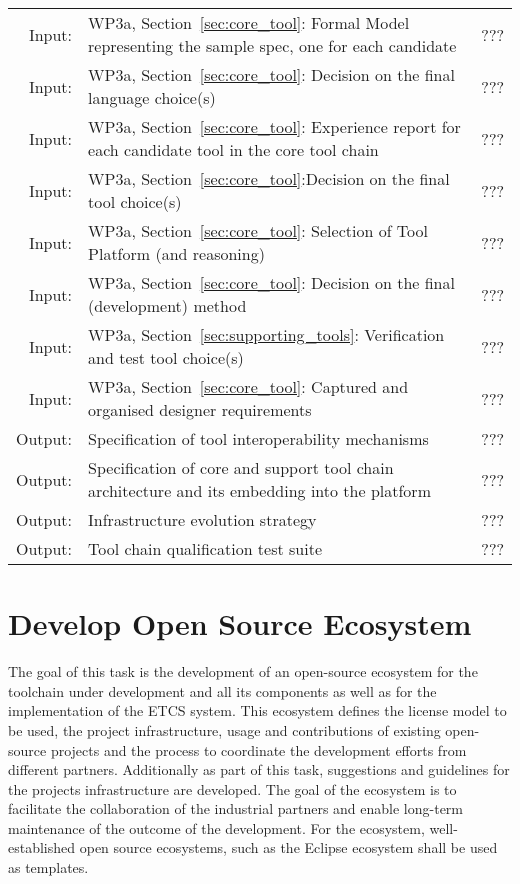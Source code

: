 \documentclass[11pt, a4paper]{article}
\newenvironment{inoutput}
{\vspace{2mm}
\noindent
\begin{tabular}{|r|p{.68\linewidth}|l|}
\hline}
{
\hline
\end{tabular}}
\begin{document}
\begin{inoutput}
Input: & WP3a, Section~\ref{sec:core_tool}: Formal Model representing the sample spec, one for each candidate  & ??? \\
Input: & WP3a, Section~\ref{sec:core_tool}: Decision on the final language choice(s) & ??? \\
Input: & WP3a, Section~\ref{sec:core_tool}: Experience report for each candidate tool in the core tool chain& ??? \\
Input: & WP3a, Section~\ref{sec:core_tool}:Decision on the final tool choice(s)  & ??? \\
Input: & WP3a, Section~\ref{sec:core_tool}: Selection of Tool Platform (and reasoning)  & ??? \\
Input: & WP3a, Section~\ref{sec:core_tool}: Decision on the final (development) method  & ??? \\
Input: & WP3a, Section~\ref{sec:supporting_tools}: Verification and test tool choice(s)  & ??? \\
Input: & WP3a, Section~\ref{sec:core_tool}: Captured and organised designer requirements  & ??? \\
\hline
Output: & Specification of tool interoperability mechanisms & ??? \\
Output: & Specification of core and support tool chain architecture and its embedding into the platform & ??? \\
Output: & Infrastructure evolution strategy & ??? \\
Output: & Tool chain qualification test suite & ??? \\
\end{inoutput}



\section{Develop Open Source Ecosystem}
The goal of this task is the development of an open-source ecosystem for the toolchain under development and all its components as well as for the implementation of the ETCS system. This ecosystem defines the license model to be used, the project infrastructure, usage and contributions of existing open-source projects and the process to coordinate the development efforts from different partners. Additionally as part of this task, suggestions and guidelines for the projects infrastructure are developed. The goal of the ecosystem is to facilitate the collaboration of the industrial partners and enable long-term maintenance of the outcome of the development. For the ecosystem, well-established open source ecosystems, such as the Eclipse ecosystem shall be used as templates.
\end{document}
